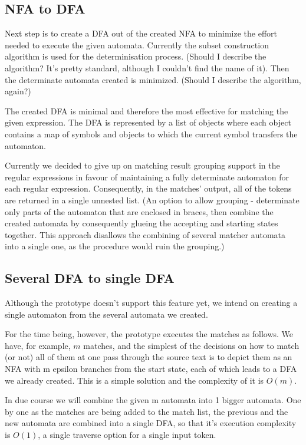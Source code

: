 \subsection{NFA to DFA}
Next step is to create a DFA out of the created NFA to minimize the
effort needed to execute the given automata. Currently the subset
construction algorithm is used for the determinisation process. (Should
I describe the algorithm? It's pretty standard, although I couldn't find
the name of it). Then the determinate automata created is minimized.
(Should I describe the algorithm, again?)

The created DFA is minimal and therefore the most effective for matching
the given expression. The DFA is represented by a list of objects where
each object contains a map of symbols and objects to which the current
symbol transfers the automaton.

Currently we decided to give up on matching result grouping support in
the regular expressions in favour of maintaining a fully determinate
automaton for each regular expression. Consequently, in the matches'
output, all of the tokens are returned in a single unnested list. (An
option to allow grouping - determinate only parts of the automaton that
are enclosed in braces, then combine the created automata by
consequently glueing the accepting and starting states together. This
approach disallows the combining of several matcher automata into a
single one, as the procedure would ruin the grouping.)

\subsection{Several DFA to single DFA}
Although the prototype doesn't support this feature yet, we intend on
creating a single automaton from the several automata we created. 

For the time being, however, the prototype executes the matches as
follows. We have, for example, $m$ matches, and the simplest of the
decisions on how to match (or not) all of them at one pass through the
source text is to depict them as an NFA with m epsilon branches from the
start state, each of which leads to a DFA we already created. This is a
simple solution and the complexity of it is $O(m)$.



In due course we will combine the given m automata into 1 bigger
automata. One by one as the matches are being added to the match list,
the previous and the new automata are combined into a single DFA, so
that it's execution complexity is $O(1)$, a single traverse option for a
single input token.

